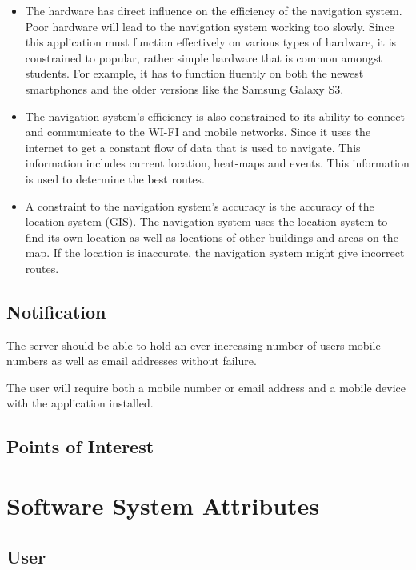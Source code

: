 \documentclass[runningheads,a4paper]{article}
\begin{document}
\begin{itemize}
\item The hardware has direct influence on the efficiency of the navigation system. Poor hardware will lead to the navigation system working too slowly. Since this application must function effectively on various types of hardware, it is constrained to popular, rather simple hardware that is common amongst students. For example, it has to function fluently on both the newest smartphones and the older versions like the Samsung Galaxy S3.

\item The navigation system’s efficiency is also constrained to its ability to connect and communicate to the WI-FI and mobile networks. Since it uses the internet to get a constant flow of data that is used to navigate. This information includes current location, heat-maps and events. This information is used to determine the best routes.

\item A constraint to the navigation system’s accuracy is the accuracy of the location system (GIS). The navigation system uses the location system to find its own location as well as locations of other buildings and areas on the map. If the location is inaccurate, the navigation system might give incorrect routes. 

\end{itemize}

\subsection{Notification}

The server should be able to hold an ever-increasing number of users mobile numbers as well as email addresses without failure.  

The user will require both a mobile number or email address and a mobile device with the application installed.

\subsection{Points of Interest}


\section{Software System Attributes}

\subsection{User}
\end{document}
